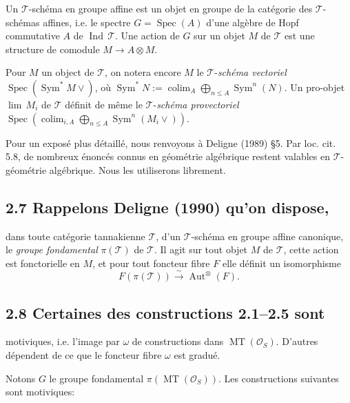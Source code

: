 \documentclass[11pt,a4paper]{article}
\theoremstyle{plain}
\theoremstyle{definition}
\theoremstyle{remark}
\DeclareMathOperator{\Spec}{Spec}
\DeclareMathOperator{\Aut}{Aut}
\DeclareMathOperator{\Sym}{Sym}
\DeclareMathOperator{\Ind}{Ind}
\DeclareMathOperator{\MT}{MT}
\DeclareMathOperator{\colim}{colim}
\newcommand{\scrO}{\mathscr{O}}
\newcommand{\scrT}{\mathscr{T}}
\newcommand{\upvee}{\vee}
\newcommand{\Le}{\leqslant}
\newcommand{\simover}{\xrightarrow{\sim}}
\newcommand{\oplusop}{\bigoplus}
\providecommand{\Aut}{\operatorname{Aut}}
\providecommand{\Spec}{\operatorname{Spec}}
\providecommand{\Le}{\leqslant}
\begin{document}
Un $\scrT$-sch\'ema en groupe affine est un
objet en groupe de la cat\'egorie des
$\scrT$-sch\'emas affines, i.e. le spectre
$G=\Spec(A)$ d'une alg\`ebre de Hopf
commutative $A$ de $\Ind\,\scrT$.
Une action de $G$ sur un objet $M$ de $\scrT$
est une structure de comodule $M\to A\otimes M$.

Pour $M$ un object de $\scrT$, on notera encore
$M$ le $\scrT$-{\it sch\'ema vectoriel}
$\Spec(\Sym^*M\upvee)$, o\`u
$\Sym^*N:=\colim_A\oplusop\limits_{n\Le A}\Sym^n(N)$. 
Un pro-objet $\lim\,M_i$ de $\scrT$ d\'efinit
de m\^{e}me le $\scrT$-{\it sch\'ema provectoriel}
$\Spec(\colim_{i,A}\oplusop_{n\Le A}
\Sym^n(M_i\upvee))$.

Pour un expos\'e plus d\'etaill\'e, nous
renvoyons \`a Deligne (1989) \S5.
Par loc. cit. 5.8, de nombreux \'enonc\'es
connus en g\'eom\'etrie alg\'ebrique restent
valables en $\scrT$-g\'eom\'etrie alg\'ebrique.
Nous les utiliserons librement.

\subsection*{2.7 Rappelons Deligne (1990) qu'on dispose,}
dans toute cat\'egorie tannakienne $\scrT$,
d'un $\scrT$-sch\'ema en groupe affine
canonique, le {\it groupe fondamental}
$\pi(\scrT)$ de $\scrT$.
Il agit sur tout objet $M$ de $\scrT$, cette
action est fonctorielle en $M$, et pour tout
foncteur fibre $F$ elle d\'efinit un
isomorphisme 
\begin{equation}
F(\pi(\scrT))\simover \Aut^\otimes(F).\tag{2.7.1}
\end{equation}


\subsection*{2.8 Certaines des constructions 2.1--2.5 sont}
motiviques, i.e. l'image par $\omega$ de
constructions dans $\MT(\scrO_S)$.
D'autres d\'ependent de ce que le foncteur
fibre $\omega$ est gradu\'e.

Notons $G$ le groupe fondamental $\pi(\MT(\scrO_S))$.
Les constructions suivantes sont motiviques:
\end{document}
